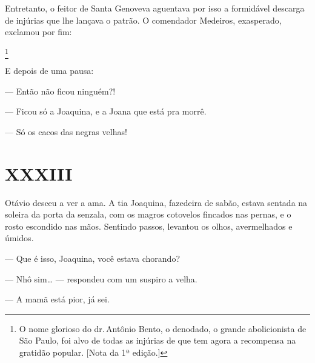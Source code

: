 {Entretanto, o feitor de Santa Genoveva aguentava por isso a
formidável descarga de injúrias que lhe lançava o patrão. O comendador
Medeiros, exasperado, exclamou por fim:

\footnote{O nome glorioso do
  dr.\,Antônio Bento, o denodado, o grande abolicionista de São Paulo,
  foi alvo de todas as injúrias de que tem agora a recompensa na
  gratidão popular. {[}Nota da 1ª edição.{]}}

E depois de uma pausa:

--- Então não ficou ninguém?!

--- Ficou só a Joaquina, e a Joana que está
pra morrê.

--- Só os cacos das negras velhas!





\section{XXXIII}


Otávio desceu a ver a ama. A tia Joaquina, fazedeira de
sabão, estava sentada na soleira da porta da senzala, com os magros
cotovelos fincados nas pernas, e o rosto escondido nas mãos. Sentindo
passos, levantou os olhos, avermelhados e úmidos.

--- Que é isso, Joaquina, você estava chorando?

--- Nhô sim\ldots{} --- respondeu com um suspiro a velha.

--- A mamã está pior, já sei.


}

